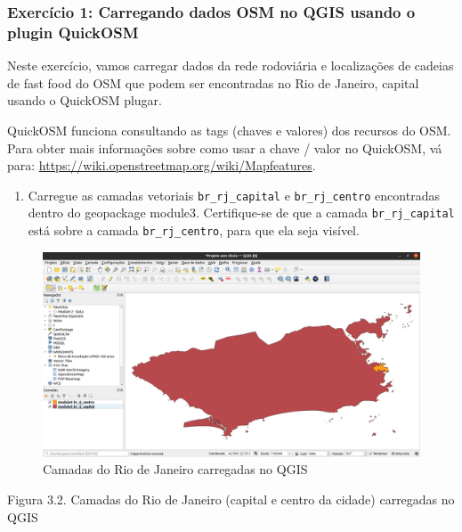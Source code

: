 \documentclass[
  portuguese,
]{krantz}
\providecommand{\tightlist}{%
  \setlength{\itemsep}{0pt}\setlength{\parskip}{0pt}}
\begin{document}
\hypertarget{exercuxedcio-1-carregando-dados-osm-no-qgis-usando-o-plugin-quickosm}{%
\subsubsection{\texorpdfstring{\textbf{Exercício 1: Carregando dados OSM no QGIS usando o plugin QuickOSM}}{Exercício 1: Carregando dados OSM no QGIS usando o plugin QuickOSM}}\label{exercuxedcio-1-carregando-dados-osm-no-qgis-usando-o-plugin-quickosm}}

Neste exercício, vamos carregar dados da rede rodoviária e localizações de cadeias de fast food do OSM que podem ser encontradas no Rio de Janeiro, capital usando o QuickOSM plugar.

QuickOSM funciona consultando as tags (chaves e valores) dos recursos do OSM. Para obter mais informações sobre como usar a chave / valor no QuickOSM, vá para: \href{https://wiki.openstreetmap.org/wiki/Mapfeatures.}{https://wiki.openstreetmap.org/wiki/Mapfeatures}.

\begin{enumerate}
\def\labelenumi{\arabic{enumi}.}
\tightlist
\item
  Carregue as camadas vetoriais \texttt{br\_rj\_capital} e \texttt{br\_rj\_centro} encontradas dentro do geopackage module3. Certifique-se de que a camada \texttt{br\_rj\_capital} está sobre a camada \texttt{br\_rj\_centro}, para que ela seja visível.
\end{enumerate}

\begin{figure}
\centering
\includegraphics{media/modulo3/quickosm-1.png}
\caption{Camadas do Rio de Janeiro carregadas no QGIS}
\end{figure}

Figura 3.2. Camadas do Rio de Janeiro (capital e centro da cidade) carregadas no QGIS
\end{document}
